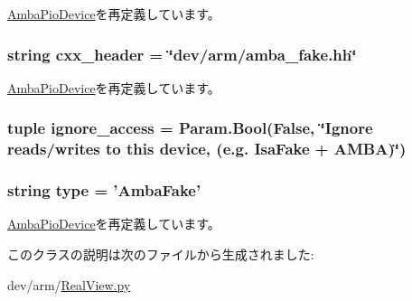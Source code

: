\hyperlink{classRealView_1_1AmbaPioDevice_ad9d2b9e37de5c1c7c10219fc1b834599}{AmbaPioDevice}を再定義しています。\hypertarget{classRealView_1_1AmbaFake_a17da7064bc5c518791f0c891eff05fda}{
\subsubsection[{cxx\_\-header}]{\setlength{\rightskip}{0pt plus 5cm}string {\bf cxx\_\-header} = \char`\"{}dev/arm/amba\_\-fake.hh\char`\"{}}}
\label{classRealView_1_1AmbaFake_a17da7064bc5c518791f0c891eff05fda}


\hyperlink{classRealView_1_1AmbaPioDevice_a17da7064bc5c518791f0c891eff05fda}{AmbaPioDevice}を再定義しています。\hypertarget{classRealView_1_1AmbaFake_ab89da802f45f5d38c00fb81d62e65abb}{
\subsubsection[{ignore\_\-access}]{\setlength{\rightskip}{0pt plus 5cm}tuple {\bf ignore\_\-access} = Param.Bool(False, \char`\"{}Ignore reads/writes to this device, (e.g. {\bf IsaFake} + AMBA)\char`\"{})}}
\label{classRealView_1_1AmbaFake_ab89da802f45f5d38c00fb81d62e65abb}
\hypertarget{classRealView_1_1AmbaFake_acce15679d830831b0bbe8ebc2a60b2ca}{
\subsubsection[{type}]{\setlength{\rightskip}{0pt plus 5cm}string {\bf type} = '{\bf AmbaFake}'}}
\label{classRealView_1_1AmbaFake_acce15679d830831b0bbe8ebc2a60b2ca}


\hyperlink{classRealView_1_1AmbaPioDevice_acce15679d830831b0bbe8ebc2a60b2ca}{AmbaPioDevice}を再定義しています。

このクラスの説明は次のファイルから生成されました:\begin{DoxyCompactItemize}
\item 
dev/arm/\hyperlink{RealView_8py}{RealView.py}\end{DoxyCompactItemize}
